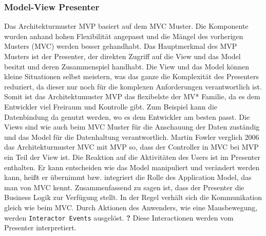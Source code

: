 \setcounter{secnumdepth}{3}
\subsubsection{Model-View Presenter}
Das Architekturmuster \ac{MVP} basiert auf dem \ac{MVC} Muster. Die Komponente wurden anhand hohen Flexibilit\"at angepasst und die M\"angel des vorherigen Musters (\ac{MVC}) werden besser gehandhabt.  Das Hauptmerkmal des \ac{MVP} Musters ist der Presenter, der direkten Zugriff auf die View und das Model besitzt und deren Zusammenspiel handhabt. Die View und das Model k\"onnen kleine Situationen selbst meistern, was das ganze die Komplexit\"at des Presenters reduziert, da dieser nur noch f\"ur die komplexen Anforderungen verantwortlich ist. Somit ist das Architektumuster \ac{MVP} das flexibelste der MV* Familie, da es dem Entwickler viel Freiraum und Kontrolle gibt. Zum Beispiel kann die Datenbindung da genutzt werden, wo es dem Entwickler am besten passt\cite{Syromiatnikov2014}.
Die Views sind wie auch beim \ac{MVC} Muster f\"ur die Anschauung der Daten zust\"andig und das Model f\"ur die Datenhaltung verantwortlich. Martin Fowler verglich 2006 das Architekturmuster \ac{MVC} mit \ac{MVP} so, dass der Controller in \ac{MVC} bei  \ac{MVP} ein Teil der View ist\cite{Bragge2013}. Die Reaktion auf die Aktivit\"aten des Users ist im Presenter enthalten. Er kann entscheiden wie das Model manipuliert und ver\"andert werden kann, hei\ss{}t er \"ubernimmt bzw. integriert die Rolle des Application Model, das man von \ac{MVC} kennt. Zusammenfassend zu sagen ist, dass der Presenter die Business Logik zur Verf\"ugung stellt.
In der Regel verh\"alt sich die Kommunikation gleich wie beim \ac{MVC}. Durch Aktionen des Anwenders, wie eine Mausbewegung, werden \texttt{Interactor Events} ausgel\"ost. \textbf{?} Diese Interactionen werden vom Presenter interpretiert\cite{Potel1996}.




